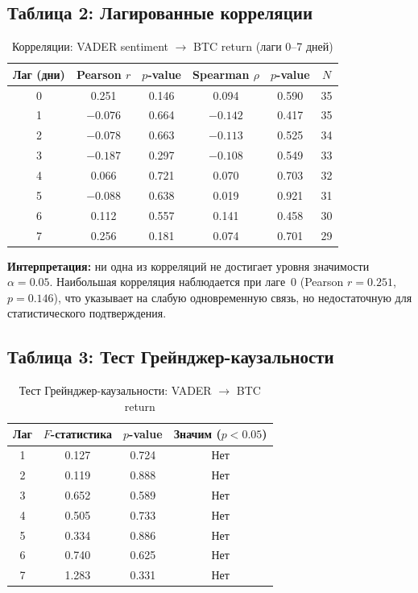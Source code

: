 \documentclass[a4paper,12pt]{article}
\begin{document}
\subsection{Таблица 2: Лагированные корреляции}

\begin{table}[H]
\centering
\caption{Корреляции: VADER sentiment $\rightarrow$ BTC return (лаги 0--7 дней)}
\label{tab:lag_corr}
\begin{tabular}{|c|c|c|c|c|c|}
\hline
\textbf{Лаг (дни)} & \textbf{Pearson $r$} & \textbf{$p$-value} & \textbf{Spearman $\rho$} & \textbf{$p$-value} & \textbf{$N$} \\
\hline
0 & 0.251 & 0.146 & 0.094 & 0.590 & 35 \\
1 & $-0.076$ & 0.664 & $-0.142$ & 0.417 & 35 \\
2 & $-0.078$ & 0.663 & $-0.113$ & 0.525 & 34 \\
3 & $-0.187$ & 0.297 & $-0.108$ & 0.549 & 33 \\
4 & 0.066 & 0.721 & 0.070 & 0.703 & 32 \\
5 & $-0.088$ & 0.638 & 0.019 & 0.921 & 31 \\
6 & 0.112 & 0.557 & 0.141 & 0.458 & 30 \\
7 & 0.256 & 0.181 & 0.074 & 0.701 & 29 \\
\hline
\end{tabular}
\end{table}

\textbf{Интерпретация:} ни одна из корреляций не достигает уровня значимости
$\alpha = 0.05$. Наибольшая корреляция наблюдается при лаге~0 (Pearson $r = 0.251$,
$p = 0.146$), что указывает на слабую одновременную связь, но недостаточную
для статистического подтверждения.

\subsection{Таблица 3: Тест Грейнджер-каузальности}

\begin{table}[H]
\centering
\caption{Тест Грейнджер-каузальности: VADER $\rightarrow$ BTC return}
\label{tab:granger}
\begin{tabular}{|c|c|c|c|}
\hline
\textbf{Лаг} & \textbf{$F$-статистика} & \textbf{$p$-value} & \textbf{Значим ($p < 0.05$)} \\
\hline
1 & 0.127 & 0.724 & Нет \\
2 & 0.119 & 0.888 & Нет \\
3 & 0.652 & 0.589 & Нет \\
4 & 0.505 & 0.733 & Нет \\
5 & 0.334 & 0.886 & Нет \\
6 & 0.740 & 0.625 & Нет \\
7 & 1.283 & 0.331 & Нет \\
\hline
\end{tabular}
\end{table}
\end{document}

